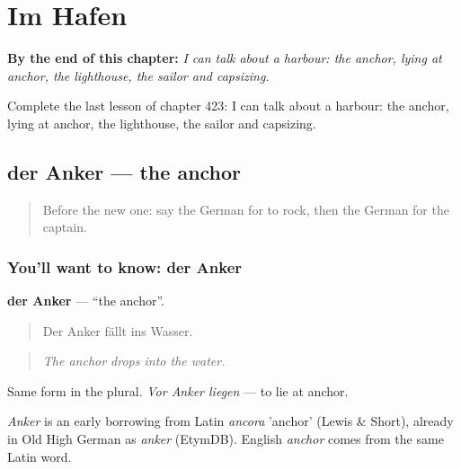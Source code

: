 
\chapter{Im Hafen}
\label{ch:ge-im-hafen}

\begin{chapteropening}
\textbf{By the end of this chapter:} \emph{I can talk about a harbour: the anchor, lying at anchor, the lighthouse, the sailor and capsizing.}

Complete the last lesson of chapter 423: I can talk about a harbour: the anchor, lying at anchor, the lighthouse, the sailor and capsizing.
\end{chapteropening}

\section[der Anker]{der Anker — the anchor}

\label{lesson:GE-C423-anker}



\begin{quote}
Before the new one: say the German for to rock, then the German for the captain.
\end{quote}

\subsection*{You'll want to know: der Anker}
\textbf{der Anker} — \textquotedblleft{}the anchor\textquotedblright{}.

\begin{quote}
Der Anker fällt ins Wasser.
\end{quote}

\begin{quote}
\emph{The anchor drops into the water.}
\end{quote}

Same form in the plural. \emph{Vor Anker liegen} — to lie at anchor.

\begin{cousinweb}
\emph{Anker} is an early borrowing from Latin \emph{ancora} 'anchor' (Lewis \& Short), already in Old High German as \emph{anker} (EtymDB). English \emph{anchor} comes from the same Latin word.
\end{cousinweb}


